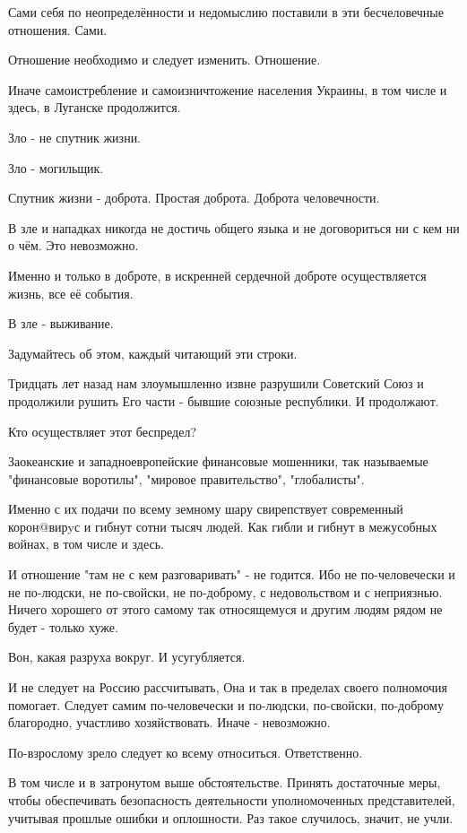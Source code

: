 \begin{itemize}
Сами себя по неопределённости и недомыслию поставили в эти бесчеловечные
отношения. Сами.

Отношение необходимо и следует изменить. Отношение.

Иначе самоистребление и самоизничтожение населения Украины, в том числе и
здесь, в Луганске продолжится.

Зло - не спутник жизни.

Зло - могильщик.

Спутник жизни - доброта. Простая доброта. Доброта человечности.

В зле и нападках никогда не достичь общего языка и не договориться ни с кем ни
о чём. Это невозможно.

Именно и только в доброте, в искренней сердечной доброте осуществляется жизнь,
все её события.

В зле - выживание.

Задумайтесь об этом, каждый читающий эти строки.

Тридцать лет назад нам злоумышленно извне разрушили Советский Союз и продолжили
рушить Его части - бывшие союзные республики. И продолжают.

Кто осуществляет этот беспредел?

Заокеанские и западноевропейские финансовые мошенники, так называемые
"финансовые воротилы", "мировое правительство", "глобалисты".

Именно с их подачи по всему земному шару свирепствует современный корон@вирyс и
гибнут сотни тысяч людей. Как гибли и гибнут в межусобных войнах, в том числе и
здесь.

И отношение "там не с кем разговаривать" - не годится. Ибо не по-человечески и
не по-людски, не по-свойски, не по-доброму, с недовольством и с неприязнью.
Ничего хорошего от этого самому так относящемуся и другим людям рядом не будет
- только хуже.

Вон, какая разруха вокруг. И усугубляется.

И не следует на Россию рассчитывать, Она и так в пределах своего полномочия
помогает. Следует самим по-человечески и по-людски, по-свойски, по-доброму
благородно, участливо хозяйствовать. Иначе - невозможно.

По-взрослому зрело следует ко всему относиться. Ответственно.

В том числе и в затронутом выше обстоятельстве. Принять достаточные меры, чтобы
обеспечивать безопасность деятельности уполномоченных представителей, учитывая
прошлые ошибки и оплошности. Раз такое случилось, значит, не учли.


\end{itemize}
